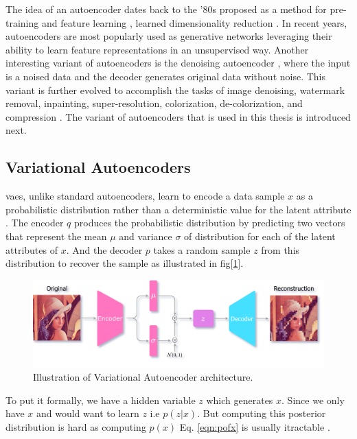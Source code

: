 The idea of an autoencoder dates back to the '80s proposed as a method for pre-training and feature learning \cite{ballard1987modular, rumelhart1985learning}, learned dimensionality reduction \cite{hinton_dimentionality}. In recent years, autoencoders are most popularly used as generative networks leveraging their ability to learn feature representations in an unsupervised way. Another interesting variant of autoencoders is the denoising autoencoder \cite{vincent2008extracting}, where the input is a noised data and the decoder generates original data without noise. This variant is further evolved to accomplish the tasks of image denoising, watermark removal, inpainting, super-resolution, colorization, de-colorization, and compression \cite{zhang2016colorful, imagedenoisingpaper}. The variant of autoencoders that is used in this thesis is introduced next.

\subsection{Variational Autoencoders}
\label{subsec:vae}
\acp{vae}, unlike standard autoencoders, learn to encode a data sample $x$ as a probabilistic distribution rather than a deterministic value for the latent attribute \cite{jeremy_jordan_2018}. The encoder $q$ produces the probabilistic distribution by predicting two vectors that represent the mean $\mu$ and variance $\sigma$ of distribution for each of the latent attributes of $x$. And the decoder $p$ takes a random sample $z$ from this distribution to recover the sample as illustrated in fig[\ref{fig:vae_arch}].

\begin{figure}[!h]
    \centering
    \includegraphics[scale=0.2]{figures/arch/vae_arch.png}
    \caption{Illustration of Variational Autoencoder architecture.}
    \label{fig:vae_arch}
\end{figure}

To put it formally, we have a hidden variable $z$ which generates $x$. Since we only have $x$ and would want to learn $z$ i.e $p(z | x)$. But computing this posterior distribution is hard as computing $p(x)$ Eq. \ref{eqn:pofx} is usually itractable \cite{kingma2013autoencoding}.

